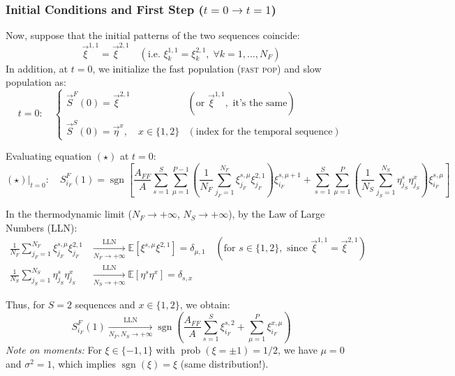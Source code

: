\subsubsection*{Initial Conditions and First Step ($t=0 \to t=1$)}

Now, suppose that the initial patterns of the two sequences coincide:
\begin{equation}
\vec{\xi}^{1,1} = \vec{\xi}^{2,1} \quad (\text{i.e. } \xi_k^{1,1} = \xi_k^{2,1}, \; \forall k=1,\dots,N_F)
\end{equation}
In addition, at $t=0$, we initialize the fast population (\textsc{fast pop}) and slow population as:
\begin{equation}
t=0: \quad
\begin{cases}
\vec{S}^F(0) = \vec{\xi}^{2,1} & (\text{or } \vec{\xi}^{1,1}, \text{ it's the same}) \\
\vec{S}^S(0) = \vec{\eta}^{x}, \quad x \in \{1,2\} & (\text{index for the temporal sequence})
\end{cases}
\end{equation}

Evaluating equation $(\star)$ at $t=0$:
\begin{equation}
(\star)\big|_{t=0}: \quad S_{i_F}^F(1) = \operatorname{sgn}\left[ \frac{A_{FF}}{A} \sum_{s=1}^{S} \sum_{\mu=1}^{P-1} \left( \frac{1}{N_F} \sum_{j_F=1}^{N_F} \xi_{j_F}^{s,\mu} \xi_{j_F}^{2,1} \right) \xi_{i_F}^{s,\mu+1} + \sum_{s=1}^{S} \sum_{\mu=1}^{P} \left( \frac{1}{N_S} \sum_{j_S=1}^{N_S} \eta_{j_S}^{s} \eta_{j_S}^{x} \right) \xi_{i_F}^{s,\mu} \right]
\end{equation}

In the thermodynamic limit ($N_F \to +\infty$, $N_S \to +\infty$), by the Law of Large Numbers (LLN):
\begin{align}
\frac{1}{N_F} \sum_{j_F=1}^{N_F} \xi_{j_F}^{s,\mu} \xi_{j_F}^{2,1} &\xrightarrow[N_F \to +\infty]{\text{LLN}} \mathbb{E}\left[\xi^{s,\mu}\xi^{2,1}\right] = \delta_{\mu,1} \quad (\text{for } s \in \{1,2\}, \text{ since } \vec{\xi}^{1,1} = \vec{\xi}^{2,1}) \\
\frac{1}{N_S} \sum_{j_S=1}^{N_S} \eta_{j_S}^{s} \eta_{j_S}^{x} &\xrightarrow[N_S \to +\infty]{\text{LLN}} \mathbb{E}\left[\eta^{s}\eta^{x}\right] = \delta_{s,x}
\end{align}

Thus, for $S=2$ sequences and $x \in \{1,2\}$, we obtain:
\begin{equation}
S_{i_F}^F(1) \xrightarrow[N_F, N_S \to +\infty]{\text{LLN}} \operatorname{sgn}\left( \frac{A_{FF}}{A} \sum_{s=1}^{S} \xi_{i_F}^{s,2} + \sum_{\mu=1}^{P} \xi_{i_F}^{x,\mu} \right)
\end{equation}
\textit{Note on moments:} For $\xi \in \{-1, 1\}$ with $\operatorname{prob}(\xi = \pm 1) = 1/2$, we have $\mu = 0$ and $\sigma^2 = 1$, which implies $\operatorname{sgn}(\xi) = \xi$ (same distribution!).

